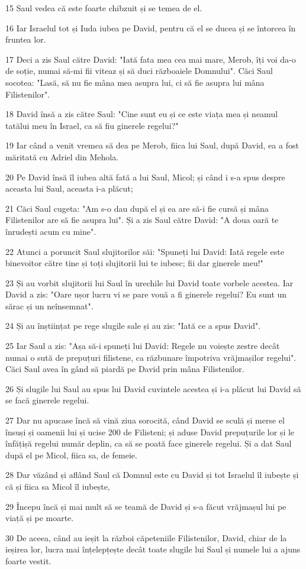 \par 15 Saul vedea că este foarte chibzuit și se temea de el.
\par 16 Iar Israelul tot și Iuda iubea pe David, pentru că el se ducea și se întorcea în fruntea lor.
\par 17 Deci a zis Saul către David: "Iată fata mea cea mai mare, Merob, îți voi da-o de soție, numai să-mi fii viteaz și să duci războaiele Domnului". Căci Saul socotea: "Lasă, să nu fie mâna mea asupra lui, ci să fie asupra lui mâna Filistenilor".
\par 18 David însă a zis către Saul: "Cine sunt eu și ce este viața mea și neamul tatălui meu în Israel, ca să fiu ginerele regelui?"
\par 19 Iar când a venit vremea să dea pe Merob, fiica lui Saul, după David, ea a fost măritată cu Adriel din Mehola.
\par 20 Pe David însă îl iubea altă fată a lui Saul, Micol; și când i s-a spus despre aceasta lui Saul, aceasta i-a plăcut;
\par 21 Căci Saul cugeta: "Am s-o dau după el și ea are să-i fie cursă și mâna Filistenilor are să fie asupra lui". Și a zis Saul către David: "A doua oară te înrudești acum cu mine".
\par 22 Atunci a poruncit Saul slujitorilor săi: "Spuneți lui David: Iată regele este binevoitor către tine și toți slujitorii lui te iubesc; fii dar ginerele meu!"
\par 23 Și au vorbit slujitorii lui Saul în urechile lui David toate vorbele acestea. Iar David a zis: "Oare ușor lucru vi se pare vouă a fi ginerele regelui? Eu sunt un sărac și un neînsemnat".
\par 24 Și au înștiințat pe rege slugile sale și au zis: "Iată ce a spus David".
\par 25 Iar Saul a zis: "Așa să-i spuneți lui David: Regele nu voiește zestre decât numai o sută de prepuțuri filistene, ca răzbunare împotriva vrăjmașilor regelui". Căci Saul avea în gând să piardă pe David prin mâna Filistenilor.
\par 26 Și slugile lui Saul au spus lui David cuvintele acestea și i-a plăcut lui David să se facă ginerele regelui.
\par 27 Dar nu apucase încă să vină ziua sorocită, când David se sculă și merse el însuși și oamenii lui și ucise 200 de Filisteni; și aduse David prepuțurile lor și le înfățișă regelui număr deplin, ca să se poată face ginerele regelui. Și a dat Saul după el pe Micol, fiica sa, de femeie.
\par 28 Dar văzând și aflând Saul că Domnul este cu David și tot Israelul îl iubește și că și fiica sa Micol îl iubește,
\par 29 Începu încă și mai mult să se teamă de David și s-a făcut vrăjmașul lui pe viață și pe moarte.
\par 30 De aceea, când au ieșit la război căpeteniile Filistenilor, David, chiar de la ieșirea lor, lucra mai înțelepțește decât toate slugile lui Saul și numele lui a ajuns foarte vestit.

